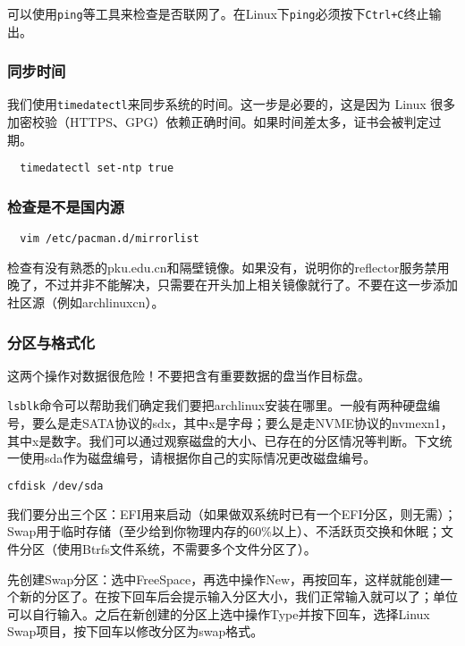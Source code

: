 可以使用\texttt{ping}等工具来检查是否联网了。在Linux下\texttt{ping}必须按下\texttt{Ctrl+C}终止输出。

\subsubsection{同步时间}

我们使用\texttt{timedatectl}来同步系统的时间。这一步是必要的，这是因为 Linux 很多加密校验（HTTPS、GPG）依赖正确时间。如果时间差太多，证书会被判定过期。

\begin{lstlisting}
  timedatectl set-ntp true
\end{lstlisting}

\subsubsection{检查是不是国内源}

\begin{lstlisting}
  vim /etc/pacman.d/mirrorlist
\end{lstlisting}

检查有没有熟悉的pku.edu.cn和隔壁镜像。如果没有，说明你的reflector服务禁用晚了，不过并非不能解决，只需要在开头加上相关镜像就行了。不要在这一步添加社区源（例如archlinuxcn）。

\subsubsection{分区与格式化}

这两个操作对数据很危险！不要把含有重要数据的盘当作目标盘。

\texttt{lsblk}命令可以帮助我们确定我们要把archlinux安装在哪里。一般有两种硬盘编号，要么是走SATA协议的sdx，其中x是字母；要么是走NVME协议的nvmexn1，其中x是数字。我们可以通过观察磁盘的大小、已存在的分区情况等判断。下文统一使用sda作为磁盘编号，请根据你自己的实际情况更改磁盘编号。

\begin{lstlisting}[language=bash]
  cfdisk /dev/sda
\end{lstlisting}

我们要分出三个区：EFI用来启动（如果做双系统时已有一个EFI分区，则无需）；Swap用于临时存储（至少给到你物理内存的60\%以上）、不活跃页交换和休眠；文件分区（使用Btrfs文件系统，不需要多个文件分区了）。

先创建Swap分区：选中FreeSpace，再选中操作New，再按回车，这样就能创建一个新的分区了。在按下回车后会提示输入分区大小，我们正常输入就可以了；单位可以自行输入。之后在新创建的分区上选中操作Type并按下回车，选择Linux Swap项目，按下回车以修改分区为swap格式。

